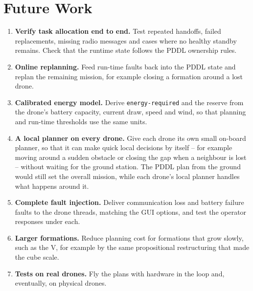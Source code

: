 \documentclass[11pt,a4paper,oneside]{report}
\newcommand{\code}[1]{\texttt{#1}}
\begin{document}
\section{Future Work}
\begin{enumerate}[itemsep=5pt]
  \item \textbf{Verify task allocation end to end.} Test repeated handoffs, failed replacements,
        missing radio messages and cases where no healthy standby remains. Check that the
        runtime state follows the PDDL ownership rules.
  \item \textbf{Online replanning.} Feed run-time faults back into the PDDL state and replan the
        remaining mission, for example closing a formation around a lost drone.
  \item \textbf{Calibrated energy model.} Derive \code{energy-required} and the reserve from the
        drone's battery capacity, current draw, speed and wind, so that planning and run-time
        thresholds use the same units.
  \item \textbf{A local planner on every drone.} Give each drone its own small on-board planner,
        so that it can make quick local decisions by itself -- for example moving around a
        sudden obstacle or closing the gap when a neighbour is lost -- without waiting for the
        ground station. The PDDL plan from the ground would still set the overall mission, while
        each drone's local planner handles what happens around it.
  \item \textbf{Complete fault injection.} Deliver communication loss and battery failure faults
        to the drone threads, matching the GUI options, and test the operator responses under
        each.
  \item \textbf{Larger formations.} Reduce planning cost for formations that grow slowly, such as
        the V, for example by the same propositional restructuring that made the cube scale.
  \item \textbf{Tests on real drones.} Fly the plans with hardware in the loop and, eventually,
        on physical drones.
\end{enumerate}
\end{document}
